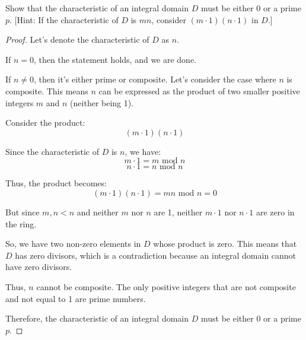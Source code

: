 \documentclass[12pt]{amsart}
\theoremstyle{definition}
\numberwithin{equation}{section}
\theoremstyle{plain}
\begin{document}
\begin{exercise}{29} Show that the characteristic of an integral domain $D$ must be either 0 or a prime $p$. [Hint: If the characteristic
    of $D$ is $mn$, consider $(m \cdot 1)(n \cdot 1)$ in $D$.]

    \begin{proof}
    Let's denote the characteristic of \( D \) as \( n \). 
    
    If \( n = 0 \), then the statement holds, and we are done. 
    
    If \( n \neq 0 \), then it's either prime or composite. Let's consider the case where \( n \) is composite. This means \( n \) can be expressed as the product of two smaller positive integers \( m \) and \( n \) (neither being 1). 
    
    Consider the product:
    \[ (m \cdot 1)(n \cdot 1) \]
    
    Since the characteristic of \( D \) is \( n \), we have:
    \[ m \cdot 1 = m \text{ mod } n \]
    \[ n \cdot 1 = n \text{ mod } n \]
    
    Thus, the product becomes:
    \[ (m \cdot 1)(n \cdot 1) = mn \text{ mod } n = 0 \]
    
    But since \( m, n < n \) and neither \( m \) nor \( n \) are 1, neither \( m \cdot 1 \) nor \( n \cdot 1 \) are zero in the ring. 
    
    So, we have two non-zero elements in \( D \) whose product is zero. This means that \( D \) has zero divisors, which is a contradiction because an integral domain cannot have zero divisors.
    
    Thus, \( n \) cannot be composite. The only positive integers that are not composite and not equal to 1 are prime numbers.
    
    Therefore, the characteristic of an integral domain \( D \) must be either 0 or a prime \( p \).
    
    \end{proof}
\end{exercise}
\vspace*{60pt}
\end{document}

